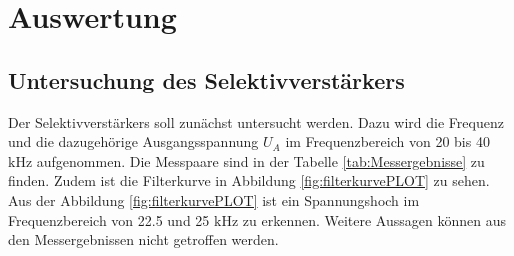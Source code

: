 \section{Auswertung}
\label{sec:Auswertung}
\subsection{Untersuchung des Selektivverstärkers}
\label{subsec:Selektivverstäarker}
Der Selektivverstärkers soll zunächst untersucht werden.
Dazu wird die Frequenz und die dazugehörige Ausgangsspannung $U_A$ im Frequenzbereich von 20 bis 40 $\si{\kilo\hertz}$ aufgenommen.
Die Messpaare sind in der Tabelle \ref{tab:Messergebnisse} zu finden.
Zudem ist die Filterkurve in Abbildung \ref{fig:filterkurvePLOT} zu sehen.
Aus der Abbildung \ref{fig:filterkurvePLOT} ist ein Spannungshoch im Frequenzbereich von 22.5 und 25 $\si{\kilo\hertz}$ zu erkennen.
Weitere Aussagen können aus den Messergebnissen nicht getroffen werden.


